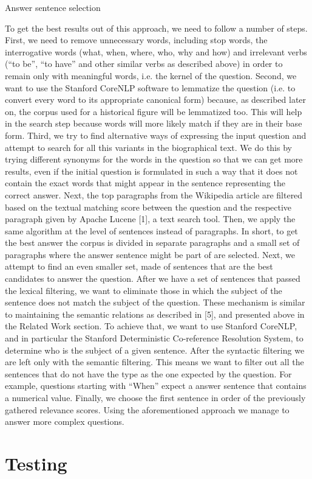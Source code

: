 Answer sentence selection

To get the best results out of this approach, we need to follow a number of steps.
First, we need to remove unnecessary words, including stop words, the interrogative words (what, when, where, who, why and how) and irrelevant verbs (“to be”, “to have” and other similar verbs as described above) in order to remain only with meaningful words, i.e. the kernel of the question.
Second, we want to use the Stanford CoreNLP software to lemmatize the question (i.e. to convert every word to its appropriate canonical form) because, as described later on, the corpus used for a historical figure will be lemmatized too. This will help in the search step because words will more likely match if they are in their base form.
Third, we try to find alternative ways of expressing the input question and attempt to search for all this variants in the biographical text. We do this by trying different synonyms for the words in the question so that we can get more results, even if the initial question is formulated in such a way that it does not contain the exact words that might appear in the sentence representing the correct answer.
Next, the top paragraphs from the Wikipedia article are filtered based on the textual matching score between the question and the respective paragraph given by Apache Lucene [1], a text search tool. Then, we apply the same algorithm at the level of sentences instead of paragraphs. In short, to get the best answer the corpus is divided in separate paragraphs and a small set of paragraphs where the answer sentence might be part of are selected. Next, we attempt to find an even smaller set, made of sentences that are the best candidates to answer the question.
After we have a set of sentences that passed the lexical filtering, we want to eliminate those in which the subject of the sentence does not match the subject of the question. These mechanism is similar to maintaining the semantic relations as described in [5], and presented above in the Related Work section. To achieve that, we want to use Stanford CoreNLP, and in particular the Stanford Deterministic Co-reference Resolution System, to determine who is the subject of a given sentence.
After the syntactic filtering we are left only with the semantic filtering. This means we want to filter out all the sentences that do not have the type as the one expected by the question. For example, questions starting with “When” expect a answer sentence that contains a numerical value.
Finally, we choose the first sentence in order of the previously gathered relevance scores. Using the aforementioned approach we manage to answer more complex questions.

\section{Testing}
\label{sec:testing}
